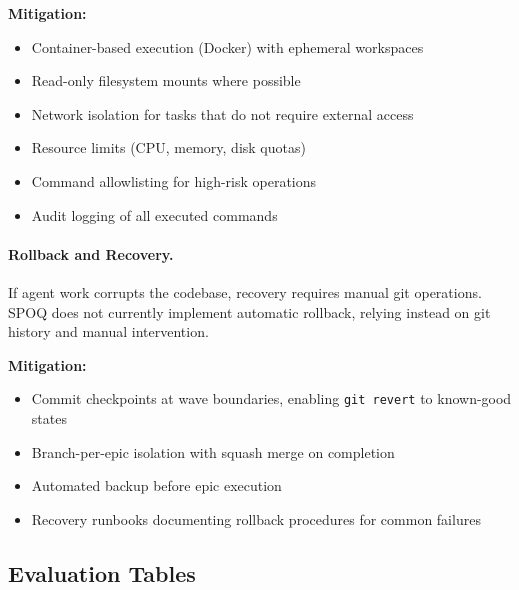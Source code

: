 \textbf{Mitigation:}
\begin{itemize}
    \item Container-based execution (Docker) with ephemeral workspaces
    \item Read-only filesystem mounts where possible
    \item Network isolation for tasks that do not require external access
    \item Resource limits (CPU, memory, disk quotas)
    \item Command allowlisting for high-risk operations
    \item Audit logging of all executed commands
\end{itemize}

\paragraph{Rollback and Recovery.}
If agent work corrupts the codebase, recovery requires manual git operations.
SPOQ does not currently implement automatic rollback, relying instead on
git history and manual intervention.

\textbf{Mitigation:}
\begin{itemize}
    \item Commit checkpoints at wave boundaries, enabling \texttt{git revert}
    to known-good states
    \item Branch-per-epic isolation with squash merge on completion
    \item Automated backup before epic execution
    \item Recovery runbooks documenting rollback procedures for common failures
\end{itemize}

\subsection{Evaluation Tables}
\label{subsec:evaluation-tables}

